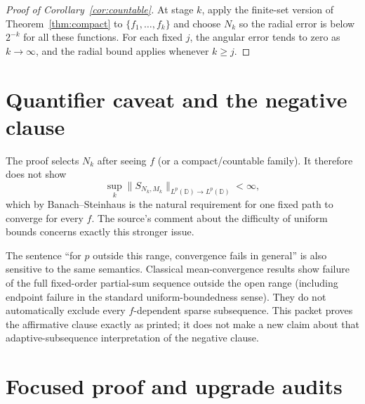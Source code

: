 \documentclass[11pt]{article}
\newcommand{\D}{\mathbb D}
\begin{document}
\begin{proof}[Proof of Corollary~\ref{cor:countable}]
At stage $k$, apply the finite-set version of Theorem~\ref{thm:compact} to
$\{f_1,\ldots,f_k\}$ and choose $N_k$ so the radial error is below $2^{-k}$
for all these functions.  For each fixed $j$, the angular error tends to zero
as $k\to\infty$, and the radial bound applies whenever $k\ge j$.
\end{proof}

\section{Quantifier caveat and the negative clause}

The proof selects $N_k$ after seeing $f$ (or a compact/countable family).
It therefore does not show
\[
 \sup_k\|S_{N_k,M_k}\|_{L^p(\D)\to L^p(\D)}<\infty,
\]
which by Banach--Steinhaus is the natural requirement for one fixed path to
converge for every $f$.  The source's comment about the difficulty of uniform
bounds concerns exactly this stronger issue.

The sentence ``for $p$ outside this range, convergence fails in general'' is
also sensitive to the same semantics.  Classical mean-convergence results
show failure of the full fixed-order partial-sum sequence outside the open
range (including endpoint failure in the standard uniform-boundedness
sense).  They do not automatically exclude every $f$-dependent sparse
subsequence.  This packet proves the affirmative clause exactly as printed;
it does not make a new claim about that adaptive-subsequence interpretation
of the negative clause.

\section{Focused proof and upgrade audits}
\end{document}

